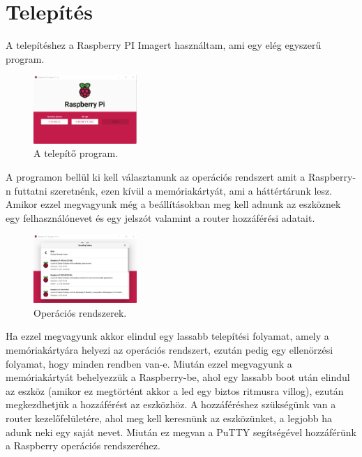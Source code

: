 \documentclass[a4paper,12pt,oneside]{report}
\begin{document}



\medskip


\chapter{Telepítés}

A telepítéshez a Raspberry PI Imagert használtam, ami egy elég egyszerű program.

\begin{figure}[htbp]
	\centering
	\includegraphics[width=0.35\textwidth]{fig/Imager.png}
	\caption{A telepítő program.}
	\label{fig-Imager}
\end{figure}
A programon bellül ki kell választanunk az operációs rendszert amit a Raspberry-n futtatni szeretnénk, ezen kívül a memóriakártyát, 
ami a háttértárunk lesz. Amikor ezzel megvagyunk még a beállításokban meg kell adnunk az eszköznek egy felhasználónevet és egy jelszót
valamint a router hozzáférési adatait.

\begin{figure}[htbp]
	\centering
	\includegraphics[width=0.35\textwidth]{fig/os.png}
	\caption{Operációs rendszerek.}
	\label{fig-os}
\end{figure}
Ha ezzel megvagyunk akkor elindul egy lassabb telepítési folyamat, amely a memóriakártyára helyezi az operációs rendszert, ezután pedig
egy ellenörzési folyamat, hogy minden rendben van-e.
Miután ezzel megvagyunk a memóriakártyát behelyezzük a Raspberry-be, ahol egy lassabb boot után elindul az eszköz (amikor ez megtörtént
akkor a led egy biztos ritmusra villog), ezután megkezdhetjük a hozzáférést az eszközhöz. 
A hozzáféréshez szükségünk van a router kezelőfelületére, ahol meg kell keresnünk az eszközünket, a legjobb ha adunk neki
egy saját nevet. Miután ez megvan a PuTTY segítségével hozzáférünk a Raspberry operációs rendszeréhez.
\end{document}
